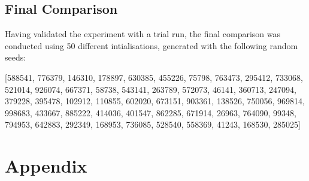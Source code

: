 \documentclass[10pt]{article}
\begin{document}
\begin{multicols}{2}
\subsection{Final Comparison}
Having validated the experiment with a trial run, the final comparison was conducted using 50 different intialisations, generated with the following random seeds:

[588541, 776379, 146310, 178897, 630385, 455226, 75798, 763473, 295412, 733068, 521014, 926074, 667371, 58738, 543141, 263789, 572073, 46141, 360713, 247094, 379228, 395478, 102912, 110855, 602020, 673151, 903361, 138526, 750056, 969814, 998683, 433667, 885222, 414036, 401547, 862285, 671914, 26963, 764090, 99348, 794953, 642883, 292349, 168953, 736085, 528540, 558369, 41243, 168530, 285025]
\end{multicols}

\newpage
\section{Appendix}
\end{document}
